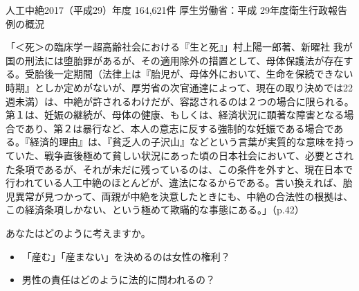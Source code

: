 \documentclass[10pt, dvipdfmx]{beamer}
\begin{document}
\begin{frame}{人工中絶}{2017（平成29）年度 164,621件 \hfill 厚生労働省：平成 29年度衛生行政報告例の概況}

\begin{block}{「＜死＞の臨床学ー超高齢社会における『生と死』」村上陽一郎著、新曜社}
我が国の刑法には堕胎罪があるが、その適用除外の措置として、母体保護法が存在する。受胎後一定期間（法律上は『胎児が、母体外において、生命を保続できない時期』としか定めがないが、厚労省の次官通達によって、現在の取り決めでは22週未満）は、中絶が許されるわけだが、容認されるのは２つの場合に限られる。第１は、妊娠の継続が、母体の健康、もしくは、経済状況に顕著な障害となる場合であり、第２は暴行など、本人の意志に反する強制的な妊娠である場合である。『経済的理由』は、『貧乏人の子沢山』などという言葉が実質的な意味を持っていた、戦争直後極めて貧しい状況にあった頃の日本社会において、必要とされた条項であるが、それが未だに残っているのは、この条件を外すと、現在日本で行われている人工中絶のほとんどが、違法になるからである。言い換えれば、胎児異常が見つかって、両親が中絶を決意したときにも、中絶の合法性の根拠は、この経済条項しかない、という極めて欺瞞的な事態にある。」（p.42）
\end{block}

\begin{alertblock}{あなたはどのように考えますか。}
\begin{itemize}
\item 「産む」「産まない」を決めるのは女性の権利？
\item 男性の責任はどのように法的に問われるの？
\end{itemize}
\end{alertblock}
%
\end{frame}
\end{document}
